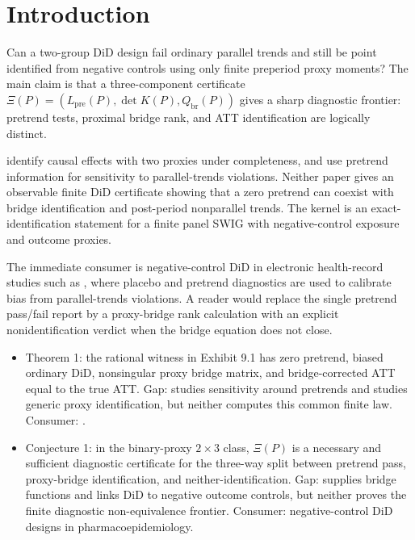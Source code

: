 \documentclass[11pt]{article}
\theoremstyle{definition}
\theoremstyle{plain}
\theoremstyle{remark}
\begin{document}
\section{Introduction}
Can a two-group DiD design fail ordinary parallel trends and still be point
identified from negative controls using only finite preperiod proxy moments?
The main claim is that a three-component certificate
$\Xi(P)=(L_{\mathrm{pre}}(P),\det K(P),Q_{\mathrm{br}}(P))$ gives a sharp
diagnostic frontier: pretrend tests, proximal bridge rank, and ATT
identification are logically distinct.

\citet[p.~1045, Theorem 1]{MiaoGengTchetgen2018} identify causal effects with
two proxies under completeness, and \citet[Section 2]{RambachanRoth2023}
use pretrend information for sensitivity to parallel-trends violations. Neither
paper gives an observable finite DiD certificate showing that a zero pretrend
can coexist with bridge identification and post-period nonparallel trends. The
kernel is an exact-identification statement for a finite panel SWIG with
negative-control exposure and outcome proxies.

The immediate consumer is negative-control DiD in electronic health-record
studies such as \citet{ZhangZhangWangEtAl2025}, where placebo and pretrend
diagnostics are used to calibrate bias from parallel-trends violations. A reader
would replace the single pretrend pass/fail report by a proxy-bridge rank
calculation with an explicit nonidentification verdict when the bridge equation
does not close.

\begin{itemize}[leftmargin=*]
\item Theorem 1: the rational witness in Exhibit 9.1 has zero pretrend, biased ordinary DiD, nonsingular proxy bridge matrix, and bridge-corrected ATT equal to the true ATT. Gap: \citet{RambachanRoth2023} studies sensitivity around pretrends and \citet{MiaoGengTchetgen2018} studies generic proxy identification, but neither computes this common finite law. Consumer: \citet{ZhangZhangWangEtAl2025}.
\item Conjecture 1: in the binary-proxy $2\times3$ class, $\Xi(P)$ is a necessary and sufficient diagnostic certificate for the three-way split between pretrend pass, proxy-bridge identification, and neither-identification. Gap: \citet{MiaoShiLiTchetgen2024} supplies bridge functions and \citet{SoferRichardsonColicinoSchwartzTchetgen2016} links DiD to negative outcome controls, but neither proves the finite diagnostic non-equivalence frontier. Consumer: negative-control DiD designs in pharmacoepidemiology.
\end{itemize}
\end{document}
